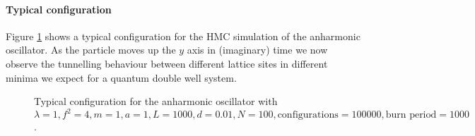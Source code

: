 \documentclass[12pt]{article}
\begin{document}
            \paragraph{Typical configuration}
                Figure \ref{fig:TypicalAnharmonicTrajectory} shows a typical configuration for the HMC simulation of the anharmonic oscillator. As the particle moves up the $y$ axis in (imaginary) time we now observe the tunnelling behaviour between different lattice sites in different minima we expect for a quantum double well system.
                \begin{figure}
                    \centering
                    \caption{Typical configuration for the anharmonic oscillator with $\lambda = 1, f^2 = 4, m = 1, a = 1, L = 1000, d = 0.01, N = 100, \text{configurations} = 100000, \text{burn period} = 1000$.}
                    \label{fig:TypicalAnharmonicTrajectory}
                \end{figure}
\end{document}
